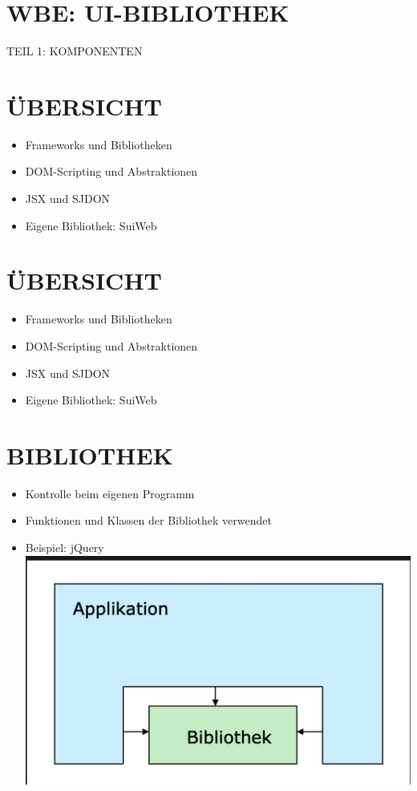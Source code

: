\documentclass[10pt]{article}
\begin{document}
\section*{WBE: UI-BIBLIOTHEK}
 TEIL 1: KOMPONENTEN\section*{ÜBERSICHT}
\begin{itemize}
  \item Frameworks und Bibliotheken
  \item DOM-Scripting und Abstraktionen
  \item JSX und SJDON
  \item Eigene Bibliothek: SuiWeb
\end{itemize}

\section*{ÜBERSICHT}
\begin{itemize}
  \item Frameworks und Bibliotheken
  \item DOM-Scripting und Abstraktionen
  \item JSX und SJDON
  \item Eigene Bibliothek: SuiWeb
\end{itemize}

\section*{BIBLIOTHEK}
\begin{itemize}
  \item Kontrolle beim eigenen Programm
  \item Funktionen und Klassen der Bibliothek verwendet
  \item Beispiel: jQuery\\
\includegraphics[width=\linewidth]{images/2025_01_02_22162ee5453ad0230328g-04}
\end{itemize}
\end{document}
